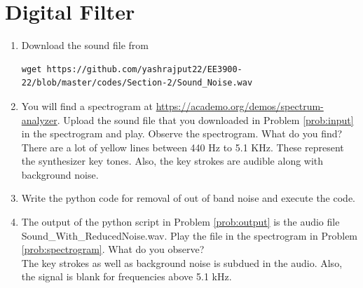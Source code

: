 \section{Digital Filter}
\begin{enumerate}[label=\thesection.\arabic*
,ref=\thesection.\theenumi]
\item
\label{prob:input}
Download the sound file from  
\begin{lstlisting}
wget https://github.com/yashrajput22/EE3900-22/blob/master/codes/Section-2/Sound_Noise.wav
\end{lstlisting}
\item
\label{prob:spectrogram}
You will find a spectrogram at \href{https://academo.org/demos/spectrum-analyzer}{\url{https://academo.org/demos/spectrum-analyzer}}. 
%
Upload the sound file that you downloaded in Problem \ref{prob:input} in the spectrogram  and play.  Observe the spectrogram. What do you find?
\\
%
\solution There are a lot of yellow lines between 440 Hz to 5.1 KHz.  These represent the synthesizer key tones. Also, the key strokes
are audible along with background noise.
\item
\label{prob:output}
Write the python code for removal of out of band noise and execute the code.
\\
\solution

%
%
\item
The output of the python script in Problem \ref{prob:output} is the audio file Sound\_With\_ReducedNoise.wav. Play the file in the spectrogram in Problem \ref{prob:spectrogram}. What do you observe?
\\
\solution The key strokes as well as background noise is subdued in the audio.  Also,  the signal is blank for frequencies above 5.1 kHz.
\end{enumerate}
